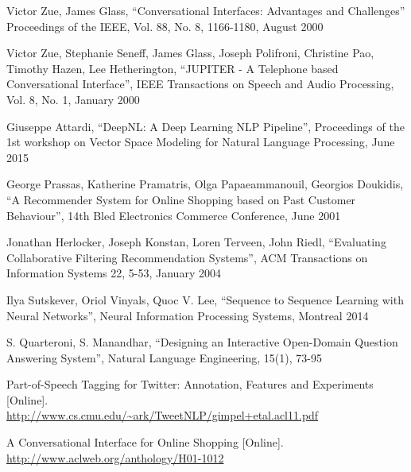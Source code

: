 %
%
% 
% 
%


\begin{thebibliography}{99.}%
%
%
Victor Zue, James Glass, “Conversational Interfaces: Advantages and Challenges” Proceedings of the IEEE, Vol. 88, No. 8, 1166-1180, August 2000

Victor Zue, Stephanie Seneff, James Glass, Joseph Polifroni, Christine Pao, Timothy Hazen, Lee Hetherington, “JUPITER - A Telephone based Conversational Interface”, IEEE Transactions on Speech and Audio Processing, Vol. 8, No. 1, January 2000

Giuseppe Attardi, “DeepNL: A Deep Learning NLP Pipeline”, Proceedings of the 1st workshop on Vector Space Modeling for Natural Language Processing, June 2015

George Prassas, Katherine Pramatris, Olga Papaeammanouil, Georgios Doukidis, “A Recommender System for Online Shopping based on Past Customer Behaviour”, 14th Bled Electronics Commerce Conference, June 2001

Jonathan Herlocker, Joseph Konstan, Loren Terveen, John Riedl, “Evaluating Collaborative Filtering Recommendation Systems”, ACM Transactions on Information Systems 22, 5-53, January 2004

Ilya Sutskever, Oriol Vinyals, Quoc V. Lee, “Sequence to Sequence Learning with Neural Networks”, Neural Information Processing Systems, Montreal 2014 

S. Quarteroni, S. Manandhar, “Designing an Interactive Open-Domain Question Answering System”, Natural Language Engineering, 15(1), 73-95

Part-of-Speech Tagging for Twitter: Annotation, Features and Experiments [Online]. \\
\url{http://www.cs.cmu.edu/~ark/TweetNLP/gimpel+etal.acl11.pdf}

A Conversational Interface for Online Shopping [Online]. \\
\url{http://www.aclweb.org/anthology/H01-1012 }


\end{thebibliography}
